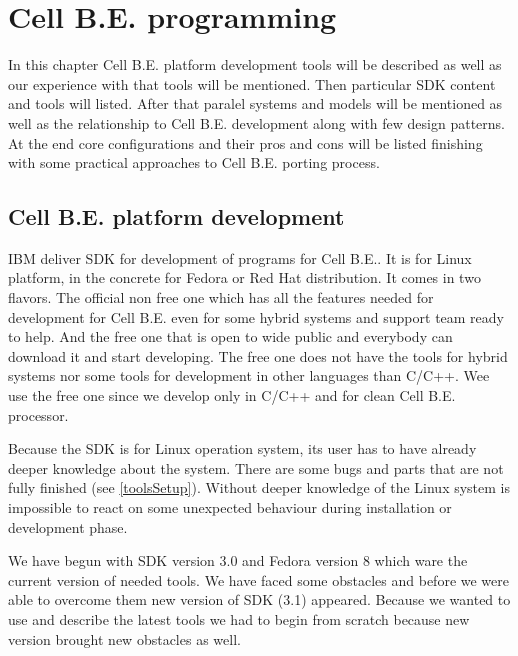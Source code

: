 \chapter {Cell B.E. programming}
\par
In this chapter Cell B.E. platform development tools will be described as well as our experience with that tools will be mentioned.
Then particular SDK content and tools will listed.
After that paralel systems and models will be mentioned as well as the relationship to Cell B.E. development along with few design patterns.
At the end core configurations and their pros and cons will be listed finishing with some practical approaches to Cell B.E. porting process.

\section{Cell B.E. platform development}
\par
IBM deliver SDK for development of programs for Cell B.E..
It is for Linux platform, in the concrete for Fedora or Red Hat distribution.
It comes in two flavors.
The official non free one which has all the features needed for development for Cell B.E. even for some hybrid systems and support team ready to help.
And the free one that is open to wide public and everybody can download it and start developing.
The free one does not have the tools for hybrid systems nor some tools for development in other languages than C/C++.
Wee use the free one since we develop only in C/C++ and for clean Cell B.E. processor.

\par
Because the SDK is for Linux operation system, its user has to have already deeper knowledge about the system.
There are some bugs and parts that are not fully finished (see \ref{toolsSetup}).
Without deeper knowledge of the Linux system is impossible to react on some unexpected behaviour during installation or development phase.

\par
We have begun with SDK version 3.0 and Fedora version 8 which ware the current version of needed tools.
We have faced some obstacles and before we were able to overcome them new version of SDK (3.1) appeared.
Because we wanted to use and describe the latest tools we had to begin from scratch because new version brought new obstacles as well.

